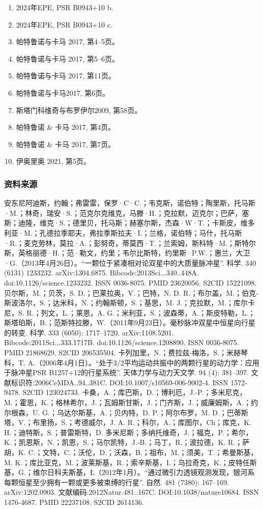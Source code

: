 \begin{enumerate}
\item 2024年EPE, PSR B0943+10 b.
\item 2024年EPE, PSR B0943+10 c.
\item 帕特鲁诺与卡马 2017, 第4–5页。
\item 帕特鲁诺与卡马 2017, 第5–6页。
\item 帕特鲁诺与卡马 2017, 第11页。
\item 帕特鲁诺与卡马2017, 第6页。
\item 斯塔门科维奇与布罗伊尔2009, 第58页。
\item 帕特鲁诺 & 卡马 2017, 第4页。
\item 帕特鲁诺 & 卡马 2017, 第7页。
\item 伊奥里奥 2021, 第5页。
\end{enumerate}
\subsubsection{资料来源}
安东尼阿迪斯，约翰；弗雷雷，保罗·C·C.；韦克斯，诺伯特；陶里斯，托马斯·M.；林奇，瑞安·S.；范克尔克维克，马滕·H.；克拉默，迈克尔；巴萨，塞斯；迪隆，维克·S.；德里贝，托马斯；赫塞尔斯，杰森·W·T.；卡斯皮，维多利亚·M.；孔德拉季耶夫，弗拉季斯拉夫·I.；兰格，诺伯特；马什，托马斯·R.；麦克劳林，莫拉·A.；彭努奇，蒂莫西·T.；兰索姆，斯科特·M.；斯特尔斯，英格丽德·H.；范·勒文，约里；韦尔比斯特，约里斯·P.W.；惠兰，大卫·G.（2013年4月26日）。“一颗位于紧凑相对论双星中的大质量脉冲星”. 科学. 340 (6131) 1233232. arXiv:1304.6875. Bibcode:2013Sci...340..448A. doi:10.1126/science.1233232. ISSN 0036-8075. PMID 23620056. S2CID 15221098.
贝尔斯，M.；贝茨，S. D.；巴莱拉奥，V.；巴特，N. D. R.；布尔盖，M.；伯克-斯波洛尔，S.；达米科，N.；约翰斯顿，S.；基思，M. J.；克拉默，M.；库尔卡尼，S. R.；列文，L.；莱恩，A. G.；米利亚，S.；波森蒂，A.；斯皮特勒，L.；斯塔珀斯，B.；范斯特拉滕，W.（2011年9月23日）。毫秒脉冲双星中恒星向行星的转变. 科学. 333 (6050): 1717–1720. arXiv:1108.5201. Bibcode:2011Sci...333.1717B. doi:10.1126/science.1208890. ISSN 0036-8075. PMID 21868629. S2CID 206535504.
卡列加里，N.；费拉兹-梅洛，S.；米赫琴科，T. A.（2006年4月1日）。“处于3/2平均运动共振中的两颗行星的动力学：应用于脉冲星PSR B1257+12的行星系统”. 天体力学与动力天文学. 94 (4): 381–397. 文献标识符:2006CeMDA..94..381C. DOI:10.1007/s10569-006-9002-4. ISSN 1572-9478. S2CID 123024733.
卡桑，A.；库巴斯，D.；博利厄，J.-P.；多米尼克，M.；霍恩，K.；格林希尔，J.；瓦姆斯甘斯，J.；门齐斯，J.；威廉姆斯，A.；约尔根森，U. G.；乌达尔斯基，A.；贝内特，D. P.；阿尔布罗，M. D.；巴蒂斯塔，V.；布里扬，S.；考德威尔，J. A. R.；科尔，A.；库图尔，Ch；库克，K. H.；迪特斯，S.；普雷斯特，D. 多米尼斯；多纳托维奇，J.；福克，P.；希尔，K.；凯恩斯，N.；凯恩，S.；马尔凯特，J.-B.；马丁，R.；波拉德，K. R.；萨胡，K. C.；文特，C.；沃伦，D.；沃森，B.；祖布，M.；须美，T.；希曼斯基，M. K.；库比亚克，M.；波莱斯基，R.；索辛斯基，I.；乌拉奇克，K.；皮特任斯基，G.；维尔日科夫斯基，Ł（2012年1月）。“通过微引力透镜观测发现，银河系每颗恒星至少拥有一颗或更多被束缚的行星”. 自然. 481 (7380): 167–169. arXiv:1202.0903. 文献编码:2012Natur.481..167C. DOI:10.1038/nature10684. ISSN 1476-4687. PMID 22237108. S2CID 2614136.
